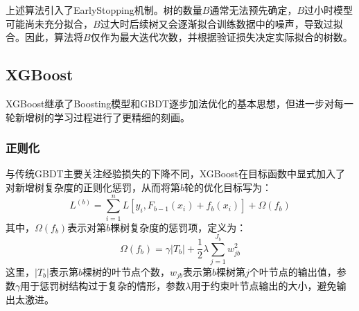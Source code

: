 上述算法引入了\gls{EarlyStopping}机制。树的数量$B$通常无法预先确定，$B$过小时模型可能尚未充分拟合，$B$过大时后续树又会逐渐拟合训练数据中的噪声，导致过拟合。因此，算法将$B$仅作为最大迭代次数，并根据验证损失决定实际拟合的树数。

\subsection{XGBoost}
XGBoost继承了Boosting模型和GBDT逐步加法优化的基本思想，但进一步对每一轮新增树的学习过程进行了更精细的刻画。\par
\subsubsection{正则化}
与传统GBDT主要关注经验损失的下降不同，XGBoost在目标函数中显式加入了对新增树复杂度的正则化惩罚，从而将第$b$轮的优化目标写为：
\begin{equation*}
	L^{(b)}=\sum_{i=1}^{n}L[y_i,F_{b-1}(x_i)+f_b(x_i)]+\Omega(f_b)
\end{equation*}
其中，$\Omega(f_b)$表示对第$b$棵树复杂度的惩罚项，定义为：
\begin{equation*}
	\Omega(f_b)=\gamma|T_b|+\frac{1}{2}\lambda\sum_{j=1}^{J_b}w_{jb}^2
\end{equation*}
这里，$|T_b|$表示第$b$棵树的叶节点个数，$w_{jb}$表示第$b$棵树第$j$个叶节点的输出值，参数$\gamma$用于惩罚树结构过于复杂的情形，参数$\lambda$用于约束叶节点输出的大小，避免输出太激进。\par
